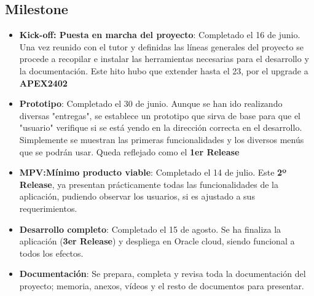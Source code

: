 \subsection{\gls{Milestone}}
\begin{itemize}
	\item \textbf{Kick-off: Puesta en marcha del proyecto}:
	Completado el 16 de junio. Una vez reunido con el tutor y definidas las líneas generales del proyecto se procede a recopilar e instalar las herramientas necesarias para el desarrollo y la documentación.
	Este hito hubo que extender hasta el 23, por el upgrade a \textbf{\acrshort{APEX}2402}
	\item \textbf{Prototipo}: Completado el 30 de junio. Aunque se han ido realizando diversas "entregas", se establece un prototipo que sirva de base para que el "usuario" verifique si se está yendo en la dirección correcta en el desarrollo. Simplemente se muestran las primeras funcionalidades y los diversos menús que se podrán usar. Queda reflejado como el \textbf{1er \gls{Release}}
	\item \textbf{\acrshort{MPV}:Mínimo producto viable}: Completado el 14 de julio. Este \textbf{2º \gls{Release}}, ya presentan prácticamente todas las funcionalidades de la aplicación, pudiendo observar los usuarios, si es ajustado a sus requerimientos.
	\item \textbf{Desarrollo completo}: Completado el 15 de agosto. Se ha finaliza la aplicación (\textbf{3er \gls{Release}}) y despliega en Oracle cloud, siendo funcional a todos los efectos.
	\item \textbf{Documentación}: Se prepara, completa y revisa toda la documentación del proyecto; memoria, anexos, vídeos y el resto de documentos para presentar.
\end{itemize}
